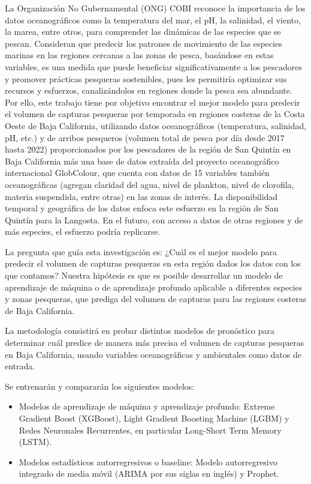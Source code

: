 \documentclass[twoside,11pt]{article}
\begin{document}
La Organización No Gubernamental (ONG) COBI reconoce la importancia de los datos oceanográficos como la temperatura del mar, el pH, la salinidad, el viento, la marea, entre otros, para comprender las dinámicas de las especies que se pescan. Consideran que predecir los patrones de movimiento de las especies marinas en las regiones cercanas a las zonas de pesca, basándose en estas variables, es una medida que puede beneficiar significativamente a los pescadores y promover prácticas pesqueras sostenibles, pues les permitiría optimizar sus recursos y esfuerzos, canalizándolos en regiones donde la pesca sea abundante. Por ello, este trabajo tiene por objetivo encontrar el mejor modelo para predecir el volumen de capturas pesqueras por temporada en regiones costeras de la Costa Oeste de Baja California, utilizando datos oceanográficos (temperatura, salinidad, pH, etc.) y de arribos pesqueros (volumen total de pesca por día desde 2017 hasta 2022) proporcionados por los pescadores de la región de San Quintín en Baja California más una base de datos extraída del proyecto oceanográfico internacional GlobColour, que cuenta con datos de 15 variables también oceanográficas (agregan claridad del agua, nivel de plankton, nivel de clorofila, materia suspendida, entre otras) en las zonas de interés. La disponibilidad temporal y geográfica de los datos  enfoca este esfuerzo en la región de San Quintín para la Langosta. En el futuro, con acceso a datos de otras regiones y de más especies, el esfuerzo podría replicarse.

La pregunta que guía esta investigación es: ¿Cuál es el mejor modelo para predecir el volumen de capturas pesqueras en esta región dados los datos con los que contamos? Nuestra hipótesis es que es posible desarrollar un modelo de aprendizaje de máquina o de aprendizaje profundo  aplicable a diferentes especies y zonas pesqueras, que prediga del volumen de capturas para las regiones costeras de Baja California.

La metodología consistirá en probar distintos modelos de pronóstico para determinar cuál predice de manera más precisa el volumen de capturas pesqueras en Baja California, usando variables oceanográficas y ambientales como datos de entrada.

Se entrenarán y compararán los siguientes modelos:
\begin{itemize}
  \item Modelos de aprendizaje de máquina y aprendizaje profundo: Extreme Gradient Boost (XGBoost), Light Gradient Boosting Machine (LGBM) y Redes Neuronales Recurrentes, en particular Long-Short Term Memory (LSTM).
  \item Modelos estadísticos autorregresivos o baseline: Modelo autorregresivo integrado de media móvil (ARIMA por sus siglas en inglés) y Prophet.
\end{itemize}
\end{document}
